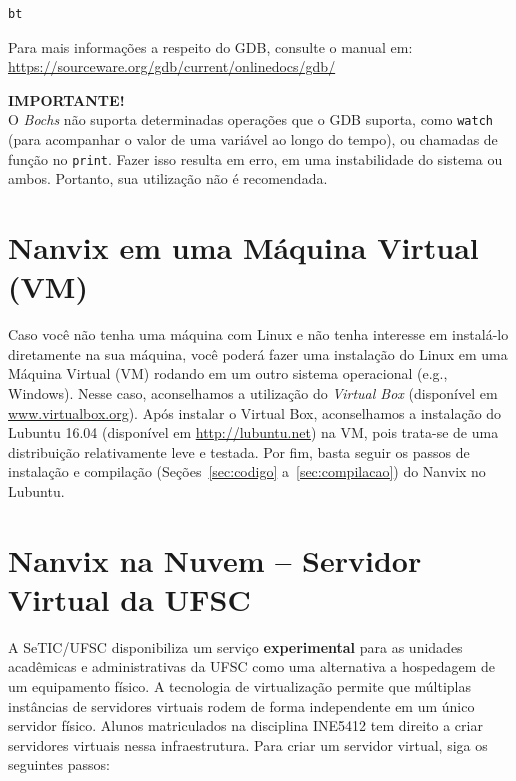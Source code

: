 \documentclass[11pt]{article}
\newcommand*{\alert}[1]{\vspace{0.4cm}\colorbox{gray!60!white}{\parbox{0.92\linewidth}{{\centering \textbf{IMPORTANTE!}\\}#1}}\vspace{0.4cm}}
\begin{document}
\begin{lstlisting}[language=sh,numbers=none,frame=single]
bt
\end{lstlisting}

\vspace{0.3cm}
Para mais informações a respeito do GDB, consulte o manual em: \url{https://sourceware.org/gdb/current/onlinedocs/gdb/}

\alert{O \textit{Bochs} não suporta determinadas operações que o GDB suporta, como \texttt{watch} (para acompanhar o valor de uma variável ao longo do tempo), ou chamadas de função no \texttt{print}. Fazer isso resulta em erro, em uma instabilidade do sistema ou ambos. Portanto, sua utilização não é recomendada.}

\section{Nanvix em uma Máquina Virtual (VM)}
\label{sec:vm}

Caso você não tenha uma máquina com Linux e não tenha interesse em instalá-lo diretamente na sua máquina, você poderá fazer uma instalação do Linux em uma Máquina Virtual (VM) rodando em um outro sistema operacional (e.g., Windows). Nesse caso, aconselhamos a utilização do \textit{Virtual Box}
(disponível em \url{www.virtualbox.org}). Após instalar o Virtual Box, aconselhamos a instalação do Lubuntu 16.04 (disponível em \url{http://lubuntu.net}) na VM, pois trata-se de uma distribuição relativamente leve e testada. Por fim, basta seguir os passos de instalação e compilação (Seções~\ref{sec:codigo} a~\ref{sec:compilacao}) do Nanvix no Lubuntu.

\section{Nanvix na Nuvem -- Servidor Virtual da UFSC}
\label{sec:vm-ufsc}

A SeTIC/UFSC disponibiliza um serviço \textbf{experimental} para as unidades acadêmicas e administrativas da UFSC como uma alternativa a hospedagem de um equipamento físico. A tecnologia de virtualização permite que múltiplas instâncias de servidores virtuais rodem de forma independente em um único servidor físico. Alunos matriculados na disciplina INE5412 tem direito a criar servidores virtuais nessa infraestrutura. Para criar um servidor virtual, siga os seguintes passos:
\end{document}
